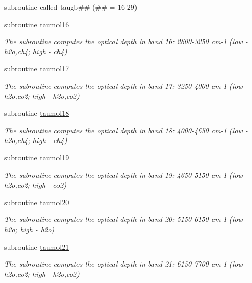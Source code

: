 \begin{DoxyCompactItemize}
\begin{DoxyCompactList}
 subroutine called taugb\#\# (\#\# = 16-\/29) \end{DoxyCompactList}\item 
subroutine \hyperlink{group__module__radsw__main_ga8702f5f6285ff1a5cbfad740545fffb6}{taumol16}
\begin{DoxyCompactList}\small\item\em The subroutine computes the optical depth in band 16\+: 2600-\/3250 cm-\/1 (low -\/ h2o,ch4; high -\/ ch4) \end{DoxyCompactList}\item 
subroutine \hyperlink{radsw__main_8f_ae46d1c061726bcde426caadd80b1fd80}{taumol17}
\begin{DoxyCompactList}\small\item\em The subroutine computes the optical depth in band 17\+: 3250-\/4000 cm-\/1 (low -\/ h2o,co2; high -\/ h2o,co2) \end{DoxyCompactList}\item 
subroutine \hyperlink{radsw__main_8f_a06f6f2b0ef60df93c267a667a2e1aa36}{taumol18}
\begin{DoxyCompactList}\small\item\em The subroutine computes the optical depth in band 18\+: 4000-\/4650 cm-\/1 (low -\/ h2o,ch4; high -\/ ch4) \end{DoxyCompactList}\item 
subroutine \hyperlink{radsw__main_8f_a776a0d78fda9f4fd0f1153b55be597df}{taumol19}
\begin{DoxyCompactList}\small\item\em The subroutine computes the optical depth in band 19\+: 4650-\/5150 cm-\/1 (low -\/ h2o,co2; high -\/ co2) \end{DoxyCompactList}\item 
subroutine \hyperlink{radsw__main_8f_a6eb9a29728a986ea6b15240adebd4a0c}{taumol20}
\begin{DoxyCompactList}\small\item\em The subroutine computes the optical depth in band 20\+: 5150-\/6150 cm-\/1 (low -\/ h2o; high -\/ h2o) \end{DoxyCompactList}\item 
subroutine \hyperlink{radsw__main_8f_a54619c48147f35da2d7855dc488c0ff4}{taumol21}
\begin{DoxyCompactList}\small\item\em The subroutine computes the optical depth in band 21\+: 6150-\/7700 cm-\/1 (low -\/ h2o,co2; high -\/ h2o,co2) \end{DoxyCompactList}\item 

\end{DoxyCompactItemize}
